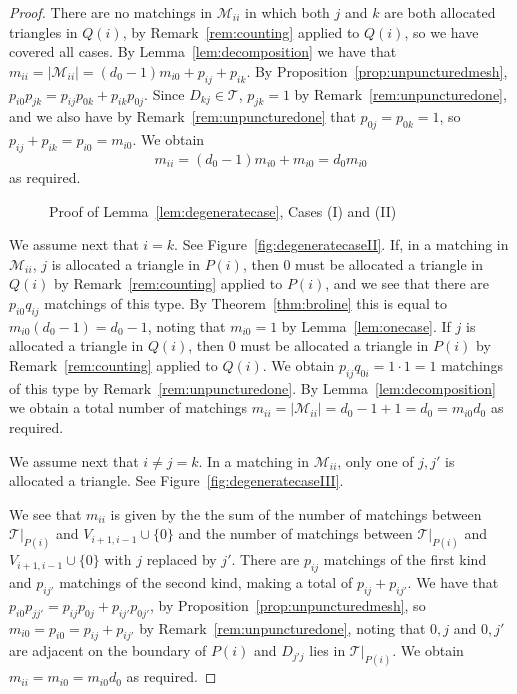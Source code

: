 \documentclass[a4paper]{amsart}
\begin{document}
\begin{proof}
There are no matchings in ${\mathcal M}_{ii}$ in which both $j$ and $k$ are both
allocated triangles in $Q(i)$, by Remark~\ref{rem:counting} applied to
$Q(i)$, so we have covered all cases.
By Lemma~\ref{lem:decomposition} we have that
$m_{ii}=|{\mathcal M}_{ii}|=(d_0-1)m_{i0}+p_{ij}+p_{ik}$.
By Proposition~\ref{prop:unpuncturedmesh},
$p_{i0}p_{jk}=p_{ij}p_{0k}+p_{ik}p_{0j}$. Since $D_{kj}\in {\mathcal T}$,
$p_{jk}=1$ by Remark~\ref{rem:unpuncturedone}, and we also have
by Remark~\ref{rem:unpuncturedone} that $p_{0j}=p_{0k}=1$, so
$p_{ij}+p_{ik}=p_{i0}=m_{i0}$. We obtain
$$m_{ii}=(d_0-1)m_{i0}+m_{i0}=d_0m_{i0}$$
as required.

\begin{figure}\label{fig:degeneratecaseIandII}
\begin{center}
\hskip 2cm
\end{center}
\caption{Proof of Lemma~\ref{lem:degeneratecase}, Cases (I) and (II)}
\end{figure}

We assume next that $i=k$.
See Figure~\ref{fig:degeneratecaseII}.
If, in a matching in ${\mathcal M}_{ii}$, $j$ is allocated a triangle in $P(i)$,
then $0$ must be allocated a triangle in $Q(i)$ by
Remark~\ref{rem:counting} applied to $P(i)$, and we see that
there are $p_{i0}q_{ij}$ matchings of this type. By
Theorem~\ref{thm:broline} this is equal to $m_{i0}(d_0-1)=d_0-1$,
noting that $m_{i0}=1$ by Lemma~\ref{lem:onecase}.
If $j$ is allocated a triangle in $Q(i)$, then $0$ must be allocated
a triangle in $P(i)$ by Remark~\ref{rem:counting} applied to $Q(i)$.
We obtain $p_{ij}q_{0i}=1\cdot 1=1$ matchings of this type by
Remark~\ref{rem:unpuncturedone}.
By Lemma~\ref{lem:decomposition} we obtain a total number of matchings
$m_{ii}=|{\mathcal M}_{ii}|=d_0-1+1=d_0=m_{i0}d_0$ as required.

We assume next that $i\not=j=k$.
In a matching in
${\mathcal M}_{ii}$, only one of $j,j'$ is allocated a triangle.
See Figure~\ref{fig:degeneratecaseIII}.

We see that $m_{ii}$ is given by the the sum of the number of matchings
between ${\mathcal T}|_{P(i)}$ and $V_{i+1,i-1}\cup \{0\}$ and the number of matchings
between ${\mathcal T}|_{P(i)}$ and $V_{i+1,i-1}\cup \{0\}$ with $j$ replaced by $j'$.
There are $p_{ij}$ matchings of the first kind and
$p_{ij'}$ matchings of the second kind, making a total of $p_{ij}+p_{ij'}$.
We have that $p_{i0}p_{jj'}=p_{ij}p_{0j}+p_{ij'}p_{0j'}$,
by Proposition~\ref{prop:unpuncturedmesh}, so $m_{i0}=p_{i0}=p_{ij}+p_{ij'}$
by Remark~\ref{rem:unpuncturedone},
noting that $0,j$ and $0,j'$ are adjacent on the boundary of $P(i)$
and $D_{j'j}$ lies in ${\mathcal T}|_{P(i)}$.
We obtain $m_{ii}=m_{i0}=m_{i0}d_0$ as required.


\end{proof}
\end{document}
